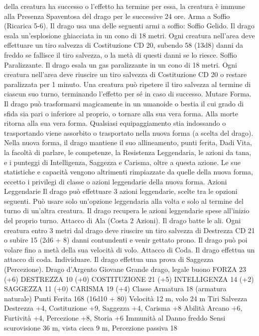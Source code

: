 \begin{multicols}{2}
della creatura ha successo o l’effetto ha termine per essa, la creatura è
immune alla Presenza Spaventosa del drago per le successive 24 ore.
Arma a Soffio (Ricarica 5-6). Il drago usa una delle seguenti armi
a soffio:
Soffio Gelido. Il drago esala un’esplosione ghiacciata in un cono di
18 metri. Ogni creatura nell’area deve effettuare un tiro salvezza di
Costituzione CD 20, subendo 58 (13d8) danni da freddo se fallisce il
tiro salvezza, o la metà di questi danni se lo riesce.
Soffio Paralizzante. Il drago esala un gas paralizzante in un cono di
18 metri. Ogni creatura nell’area deve riuscire un tiro salvezza di
Costituzione CD 20 o restare paralizzata per 1 minuto. Una creatura
può ripetere il tiro salvezza al termine di ciascun suo turno,
terminando l’effetto per sé in caso di successo.
Mutare Forma. Il drago può trasformarsi magicamente in un
umanoide o bestia il cui grado di sfida sia pari o inferiore al proprio,
o tornare alla sua vera forma. Alla morte ritorna alla sua vera forma.
Qualsiasi equipaggiamento stia indossando o trasportando viene
assorbito o trasportato nella nuova forma (a scelta del drago).
Nella nuova forma, il drago mantiene il suo allineamento, punti
ferita, Dadi Vita, la facoltà di parlare, le competenze, la Resistenza
Leggendaria, le azioni da tana, e i punteggi di Intelligenza, Saggezza
e Carisma, oltre a questa azione. Le sue statistiche e capacità
vengono altrimenti rimpiazzate da quelle della nuova forma, eccetto i
privilegi di classe o azioni leggendarie della nuova forma.
Azioni Leggendarie
Il drago può effettuare 3 azioni leggendarie, scelte tra le opzioni
seguenti. Può usare solo un’opzione leggendaria alla volta e solo
al termine del turno di un’altra creatura. Il drago recupera le
azioni leggendarie spese all’inizio del proprio turno.
Attacco di Ala (Costa 2 Azioni). Il drago batte le ali. Ogni
creatura entro 3 metri dal drago deve riuscire un tiro salvezza di
Destrezza CD 21 o subire 15 (2d6 + 8) danni contundenti e venir
gettato prono. Il drago può poi volare fino a metà della sua
velocità di volo.
Attacco di Coda. Il drago effettua un attacco di coda.
Individuare. Il drago effettua una prova di Saggezza
(Percezione).
Drago d’Argento Giovane
Grande drago, legale buono
FORZA 23 (+6)
DESTREZZA 10 (+0)
COSTITUZIONE 21 (+5)
INTELLIGENZA 14 (+2)
SAGGEZZA 11 (+0)
CARISMA 19 (+4)
Classe Armatura 18 (armatura naturale)
Punti Ferita 168 (16d10 + 80)
Velocità 12 m, volo 24 m
Tiri Salvezza Destrezza +4, Costituzione +9, Saggezza +4,
Carisma +8
Abilità Arcano +6, Furtività +4, Percezione +8, Storia +6
Immunità al Danno freddo
Sensi scurovisione 36 m, vista cieca 9 m, Percezione passiva 18

\end{multicols}
